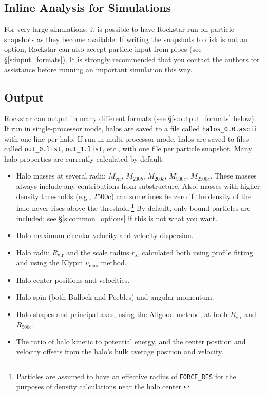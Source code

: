 \documentclass[12pt]{article}
\begin{document}
\subsection{Inline Analysis for Simulations}
      For very large simulations, it is possible to have Rockstar run on particle snapshots as they become available.  If writing the snapshots to disk is not an option, Rockstar can also accept particle input from pipes (see \S \ref{s:input_formats}).  It is strongly recommended that you contact the authors for assistance before running an important simulation this way.

\subsection{Output}
\label{s:output}
Rockstar can output in many different formats (see \S \ref{s:output_formats} below).  If run in single-processor mode, halos are saved to a file called \texttt{halos\_0.0.ascii} with one line per halo.  If run in multi-processor mode, halos are saved to files called \texttt{out\_0.list}, \texttt{out\_1.list}, etc., with one file per particle snapshot.  Many halo properties are currently calculated by default:
\begin{itemize}
\item Halo masses at several radii: $M_\mathrm{vir}$, $M_{200b}$, $M_{200c}$, $M_{500c}$, $M_{2500c}$.  These masses always include any contributions from substructure.  Also, masses with higher density thresholds (e.g., 2500c) can sometimes be zero if the density of the halo never rises above the threshold.\footnote{Particles are assumed to have an effective radius of \texttt{FORCE\_RES} for the purposes of density calculations near the halo center.}  By default, only bound particles are included; see \S \ref{s:common_options} if this is not what you want.
\item Halo maximum circular velocity and velocity dispersion.
\item Halo radii: $R_\mathrm{vir}$ and the scale radius $r_s$, calculated both using profile fitting and using the Klypin $v_\mathrm{max}$ method.
\item Halo center positions and velocities.
\item Halo spin (both Bullock and Peebles) and angular momentum.
\item Halo shapes and principal axes, using the Allgood method, at both $R_\mathrm{vir}$ and $R_\mathrm{500c}$.
\item The ratio of halo kinetic to potential energy, and the center position and velocity offsets from the halo's bulk average position and velocity.
\end{itemize}
\end{document}
